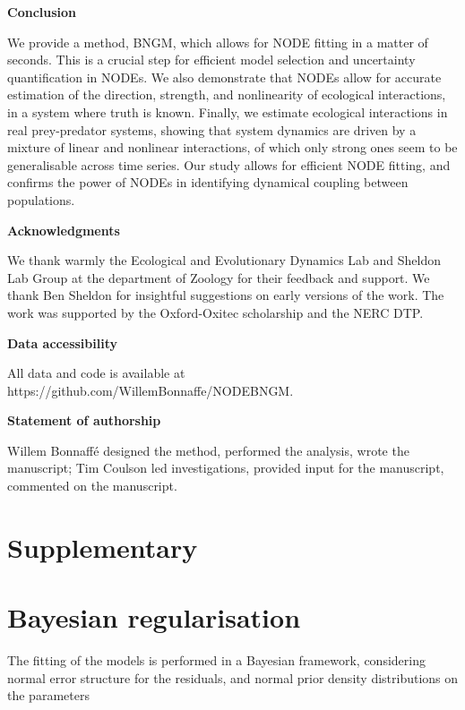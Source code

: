 \documentclass[11pt, oneside]{article}
\newcommand{\beginsupplement}{%
        \setcounter{table}{0}
        \renewcommand{\thetable}{S\arabic{table}}%
        \setcounter{figure}{0}
        \renewcommand{\thefigure}{S\arabic{figure}}%
     }
\begin{document}
\textbf{Conclusion}

We provide a method, BNGM, which allows for NODE fitting in a matter of seconds.
This is a crucial step for efficient model selection and uncertainty quantification in NODEs.
We also demonstrate that NODEs allow for accurate estimation of the direction, strength, and nonlinearity of ecological interactions, in a system where truth is known.
Finally, we estimate ecological interactions in real prey-predator systems, showing that system dynamics are driven by a mixture of linear and nonlinear interactions, of which only strong ones seem to be generalisable across time series.
Our study allows for efficient NODE fitting, and confirms the power of NODEs in identifying dynamical coupling between populations. 

\textbf{Acknowledgments}

We thank warmly the Ecological and Evolutionary Dynamics Lab and Sheldon Lab Group at the department of Zoology for their feedback and support.
We thank Ben Sheldon for insightful suggestions on early versions of the work.
The work was supported by the Oxford-Oxitec scholarship and the NERC DTP.

\textbf{Data accessibility}

All data and code is available at https://github.com/WillemBonnaffe/NODEBNGM.

\textbf{Statement of authorship}

Willem Bonnaff\'e designed the method, performed the analysis, wrote the manuscript; 
Tim Coulson led investigations, provided input for the manuscript, commented on the manuscript.

\printbibliography 


\newpage
\section{Supplementary}
\appendix
\beginsupplement
{}

\section{Bayesian regularisation}

The fitting of the models is performed in a Bayesian framework, considering normal error structure for the residuals, and normal prior density distributions on the parameters
\end{document}
